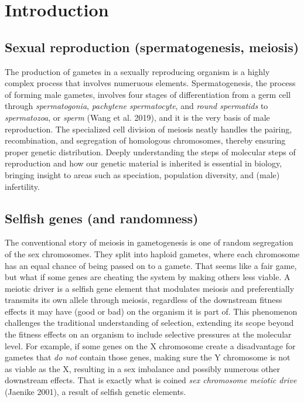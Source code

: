 \documentclass[
  a4paper,
]{scrbook}
\let\oldemph\emph
\renewcommand\emph[1]{\oldemph{\color{gray}#1}}
\renewcommand*\contentsname{Table of contents}
\newcommand\contentsname{Table of contents}
\begin{document}
\renewcommand*\contentsname{Table of contents}
{
\setcounter{tocdepth}{1}
\tableofcontents
}

\mainmatter
\chapter{Introduction}\label{introduction}

\section{Sexual reproduction (spermatogenesis,
meiosis)}\label{sexual-reproduction-spermatogenesis-meiosis}

The production of gametes in a sexually reproducing organism is a highly
complex process that involves numeruous elements. Spermatogenesis, the
process of forming male gametes, involves four stages of differentiation
from a germ cell through \emph{spermatogonia}, \emph{pachytene
spermatocyte}, and \emph{round spermatids} to \emph{spermatozoa}, or
\emph{sperm} (Wang et al. 2019), and it is the very basis of male
reproduction. The specialized cell division of meiosis neatly handles
the pairing, recombination, and segregation of homologous chromosomes,
thereby ensuring proper genetic distribution. Deeply understanding the
steps of molecular steps of reproduction and how our genetic material is
inherited is essential in biology, bringing insight to areas such as
speciation, population diversity, and (male) infertility.

\section{Selfish genes (and
randomness)}\label{selfish-genes-and-randomness}

The conventional story of meiosis in gametogenesis is one of random
segregation of the sex chromosomes. They split into haploid gametes,
where each chromosome has an equal chance of being passed on to a
gamete. That seems like a fair game, but what if some genes are cheating
the system by making others less viable. A meiotic driver is a selfish
gene element that modulates meiosis and preferentially transmits its own
allele through meiosis, regardless of the downstream fitness effects it
may have (good or bad) on the organism it is part of. This phenomenon
challenges the traditional understanding of selection, extending its
scope beyond the fitness effects on an organism to include selective
pressures at the molecular level. For example, if some genes on the X
chromosome create a disadvantage for gametes that \emph{do not} contain
those genes, making sure the Y chromosome is not as viable as the X,
resulting in a sex imbalance and possibly numerous other downstream
effects. That is exactly what is coined \emph{sex chromosome meiotic
drive} (Jaenike 2001), a result of selfish genetic elements.
\end{document}
